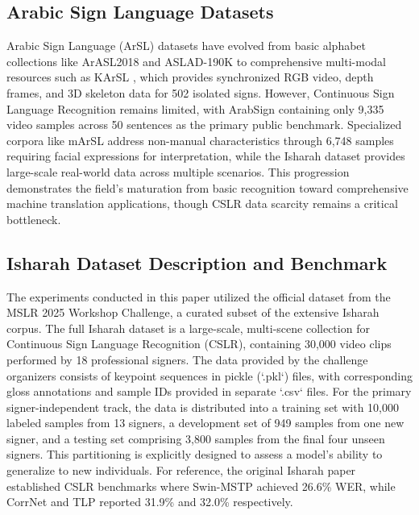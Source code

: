 \subsection{Arabic Sign Language Datasets}

Arabic Sign Language (ArSL) datasets have evolved from basic alphabet collections like ArASL2018 \cite{latif2018arabic} and ASLAD-190K \cite{boulesnane2024aslad} to comprehensive multi-modal resources such as KArSL \cite{sidig2021karsl}, which provides synchronized RGB video, depth frames, and 3D skeleton data for 502 isolated signs. However, Continuous Sign Language Recognition remains limited, with ArabSign \cite{luqmanArabsign2023} containing only 9,335 video samples across 50 sentences as the primary public benchmark. Specialized corpora like mArSL \cite{electronics10141739} address non-manual characteristics through 6,748 samples requiring facial expressions for interpretation, while the Isharah dataset \cite{alyami2025isharahlargescalemultiscenedataset} provides large-scale real-world data across multiple scenarios. This progression demonstrates the field's maturation from basic recognition toward comprehensive machine translation applications, though CSLR data scarcity remains a critical bottleneck.

\subsection{Isharah Dataset Description and Benchmark}

The experiments conducted in this paper utilized the official dataset from the MSLR 2025 Workshop Challenge, a curated subset of the extensive Isharah corpus. The full Isharah dataset is a large-scale, multi-scene collection for Continuous Sign Language Recognition (CSLR), containing 30,000 video clips performed by 18 professional signers. The data provided by the challenge organizers consists of keypoint sequences in pickle (`.pkl`) files, with corresponding gloss annotations and sample IDs provided in separate `.csv` files. For the primary signer-independent track, the data is distributed into a training set with 10,000 labeled samples from 13 signers, a development set of 949 samples from one new signer, and a testing set comprising 3,800 samples from the final four unseen signers. This partitioning is explicitly designed to assess a model's ability to generalize to new individuals. For reference, the original Isharah paper established CSLR benchmarks where Swin-MSTP achieved 26.6\% WER, while CorrNet and TLP reported 31.9\% and 32.0\% respectively.

